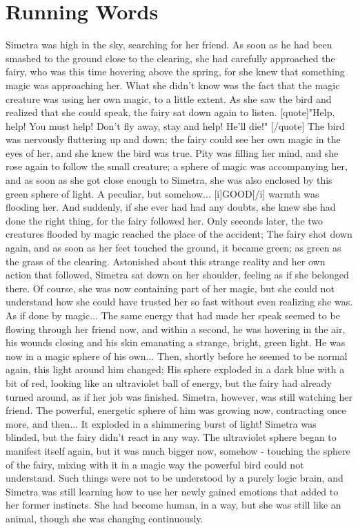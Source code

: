 \chapter{Running Words}
\label{cha:running-words}
Simetra was high in the sky, searching for her friend. As soon as he had been smashed to the ground close to the clearing, she had carefully approached the fairy, who was this time hovering above the spring, for she knew that something magic was approaching her. What she didn't know was the fact that the magic creature was using her own magic, to a little extent. As she saw the bird and realized that she could speak, the fairy sat down again to listen. 
[quote]"Help, help! You must help! Don't fly away, stay and help! He'll die!"
[/quote]
The bird was nervously fluttering up and down; the fairy could see her own magic in the eyes of her, and she knew the bird was true. Pity was filling her mind, and she rose again to follow the small creature; a sphere of magic was accompanying her, and as soon as she got close enough to Simetra, she was also enclosed by this green sphere of light. A peculiar, but somehow... [i]GOOD[/i] warmth was flooding her. And suddenly, if she ever had had any doubts, she knew she had done the right thing, for the fairy followed her. Only seconds later, the two creatures flooded by magic reached the place of the accident; The fairy shot down again, and as soon as her feet touched the ground, it became green; as green as the grass of the clearing. Astonished about this strange reality and her own action that followed, Simetra sat down on her shoulder, feeling as if she belonged there. Of course, she was now containing part of her magic, but she could not understand how she could have trusted her so fast without even realizing she was. As if done by magic... 
The same energy that had made her speak seemed to be flowing through her friend now, and within a second, he was hovering in the air, his wounds closing and his skin emanating a strange, bright, green light. He was now in a magic sphere of his own... 
Then, shortly before he seemed to be normal again, this light around him changed; His sphere exploded in a dark blue with a bit of red, looking like an ultraviolet ball of energy, but the fairy had already turned around, as if her job was finished. Simetra, however, was still watching her friend. 
The powerful, energetic sphere of him was growing now, contracting once more, and then... 
It exploded in a shimmering burst of light! 
Simetra was blinded, but the fairy didn't react in any way. The ultraviolet sphere began to manifest itself again, but it was much bigger now, somehow - touching the sphere of the fairy, mixing with it in a magic way the powerful bird could not understand. Such things were not to be understood by a purely logic brain, and Simetra was still learning how to use her newly gained emotions that added to her former instincts. She had become human, in a way, but she was still like an animal, though she was changing continuously. 
